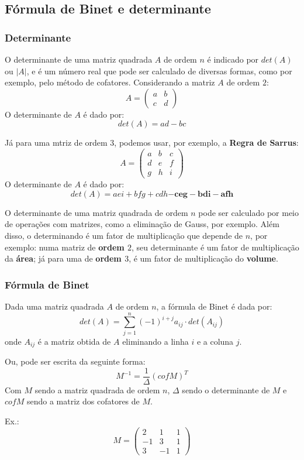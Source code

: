 \documentclass[12pt]{article}
\begin{document}
\subsection{Fórmula de Binet e determinante}
\subsubsection{Determinante}
O determinante de uma matriz quadrada $A$ de ordem $n$ é indicado por $det(A)$ ou $|A|$, e é um número real que pode ser calculado de diversas formas, como por exemplo, pelo método de cofatores.
Considerando a matriz $A$ de ordem $2$:
\[
A = \begin{pmatrix}
    a  &  b \\
    c  &  d
\end{pmatrix}
\]
O determinante de $A$ é dado por:
\[
det(A) = ad - bc
\]

\noindent
Já para uma mtriz de ordem $3$, podemos usar, por exemplo, a \textbf{Regra de Sarrus}:
\[
A = \begin{pmatrix}
    a  &  b  &  c \\
    d  &  e  &  f \\
    g  &  h  &  i
\end{pmatrix}
\]
O determinante de $A$ é dado por:
\[
det(A) = aei + bfg + cdh \mathbf{- ceg - bdi - afh}
\]

O determinante de uma matriz quadrada de ordem $n$ pode ser calculado por meio de operações com matrizes, como a eliminação de Gauss, por exemplo.
Além disso, o determinando é um fator de multiplicação que depende de $n$, por exemplo: numa matriz de \textbf{ordem $2$}, seu determinante é um fator de multiplicação da \textbf{área}; já para uma de \textbf{ordem $3$}, é um fator de multiplicação do \textbf{volume}.

\subsubsection{Fórmula de Binet}
Dada uma matriz quadrada $A$ de ordem $n$, a fórmula de Binet é dada por:
\[
det(A) = \sum_{j=1}^{n} (-1)^{i+j} a_{ij} \cdot det(A_{ij})
\]
onde $A_{ij}$ é a matriz obtida de $A$ eliminando a linha $i$ e a coluna $j$.

Ou, pode ser escrita da seguinte forma:
\[
M^{-1} = \frac{1}{\Delta} (cofM)^T
\]
Com $M$ sendo a matriz quadrada de ordem $n$, $\Delta$ sendo o determinante de $M$ e $cofM$ sendo a matriz dos cofatores de $M$.

\pagebreak
Ex.: \[
M = \begin{pmatrix}
    2  &  1  &  1 \\
   -1  &  3  &  1 \\
    3  & -1  &  1
\end{pmatrix}
\]
\end{document}
